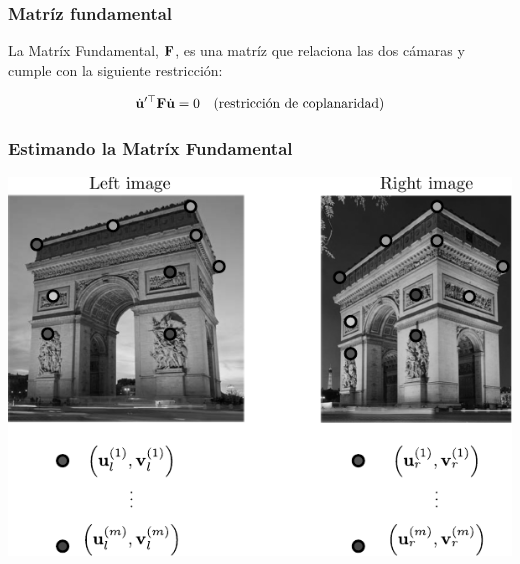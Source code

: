 \begin{frame}
    \frametitle{Matríz fundamental}
    \footnotesize

    La Matríx Fundamental, $\boldsymbol{\mathbf{F}}$,  es una matríz que relaciona las dos cámaras y cumple con la siguiente restricción:

    
    \begin{equation*}
        \dot{\boldsymbol{\mathbf{u}}}^{\prime\top} \boldsymbol{\mathbf{F}} \dot{\boldsymbol{\mathbf{u}}} = 0 \quad \text{(restricción de coplanaridad)}
    \end{equation*}
    
\end{frame}


\begin{frame}
    \frametitle{Estimando la Matríx Fundamental}
    \footnotesize

    \begin{center}
        \includegraphics[width=0.5\columnwidth]{./images/features_matching.pdf}
    \end{center}

\end{frame}

